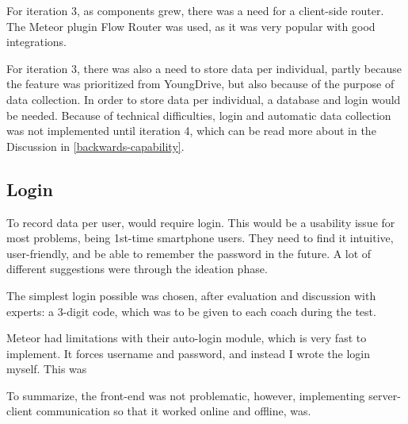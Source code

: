 For iteration 3, as components grew, there was a need for a client-side router. The Meteor plugin Flow Router was used, as it was very popular with good integrations.

For iteration 3, there was also a need to store data per individual, partly because the feature was prioritized from YoungDrive, but also because of the purpose of data collection. In order to store data per individual, a database and login would be needed. Because of technical difficulties, login and automatic data collection was not implemented until iteration 4, which can be read more about in the Discussion in \ref{backwards-capability}.

\subsection{Login}
To record data per user, would require login. This would be a usability issue for most problems, being 1st-time smartphone users. They need to find it intuitive, user-friendly, and be able to remember the password in the future. A lot of different suggestions were through the ideation phase.

The simplest login possible was chosen, after evaluation and discussion with experts: a 3-digit code, which was to be given to each coach during the test.


Meteor had limitations with their auto-login module, which is very fast to implement. It forces username and password, and instead I wrote the login myself. This was

To summarize, the front-end was not problematic, however, implementing server-client communication so that it worked online and offline, was.


